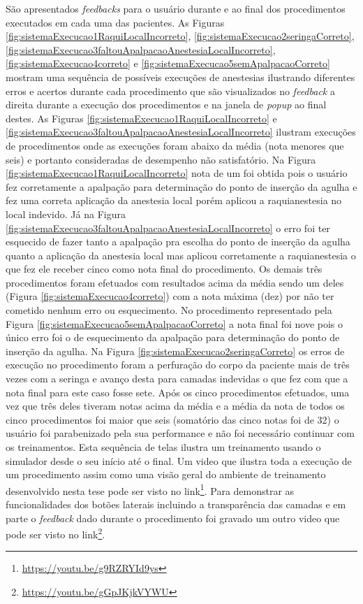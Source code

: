 São apresentados \textit{feedbacks} para o usuário durante e ao final dos procedimentos executados em cada uma das pacientes. As Figuras \ref{fig:sistemaExecucao1RaquiLocalIncorreto}, \ref{fig:sistemaExecucao2seringaCorreto}, \ref{fig:sistemaExecucao3faltouApalpacaoAnestesiaLocalIncorreto}, \ref{fig:sistemaExecucao4correto} e \ref{fig:sistemaExecucao5semApalpacaoCorreto} mostram uma sequência de possíveis execuções de anestesias ilustrando diferentes erros e acertos durante cada procedimento que são visualizados no \textit{feedback} a direita durante a execução dos procedimentos e na janela de \textit{popup} ao final destes. As Figuras \ref{fig:sistemaExecucao1RaquiLocalIncorreto} e \ref{fig:sistemaExecucao3faltouApalpacaoAnestesiaLocalIncorreto} ilustram execuções de procedimentos onde as execuções foram abaixo da média (nota menores que seis) e portanto consideradas de desempenho não satisfatório. Na Figura \ref{fig:sistemaExecucao1RaquiLocalIncorreto}  nota de um foi obtida pois o usuário fez corretamente a apalpação para determinação do ponto de inserção da agulha e fez uma correta aplicação da anestesia local porém aplicou a raquianestesia no local indevido. Já na Figura \ref{fig:sistemaExecucao3faltouApalpacaoAnestesiaLocalIncorreto} o erro foi ter esquecido de fazer tanto a apalpação pra escolha do ponto de inserção da agulha quanto a aplicação da anestesia local mas aplicou corretamente a raquianestesia o que fez ele receber cinco como nota final do procedimento. Os demais três procedimentos foram efetuados com resultados acima da média sendo um deles (Figura \ref{fig:sistemaExecucao4correto}) com a nota máxima (dez) por não ter cometido nenhum erro ou esquecimento. No procedimento representado pela Figura \ref{fig:sistemaExecucao5semApalpacaoCorreto} a nota final foi nove pois o único erro foi o de esquecimento da apalpação para determinação do ponto de inserção da agulha. Na Figura \ref{fig:sistemaExecucao2seringaCorreto} os erros de execução no procedimento foram a perfuração do corpo da paciente mais de três vezes com a seringa e avanço desta para camadas indevidas o que fez com que a nota final para este caso fosse sete. 
Após os cinco procedimentos efetuados, uma vez que três deles tiveram notas acima da média e a média da nota de todos os cinco procedimentos foi maior que seis (somatório das cinco notas foi de 32) o usuário foi parabenizado pela sua performance e não foi necessário continuar com os treinamentos. Esta sequência de telas ilustra um treinamento usando o simulador desde o seu início até o final. Um video que ilustra toda a execução de um procedimento assim como uma visão geral do ambiente de treinamento desenvolvido nesta tese pode ser visto no link\footnote{\url{https://youtu.be/g9RZRYId9ys}}. Para demonstrar as funcionalidades dos botões laterais incluindo a transparência das camadas e em parte o \textit{feedback} dado durante o procedimento foi gravado um outro video que pode ser visto no link\footnote{\url{https://youtu.be/gGpJKjkVYWU}}.

